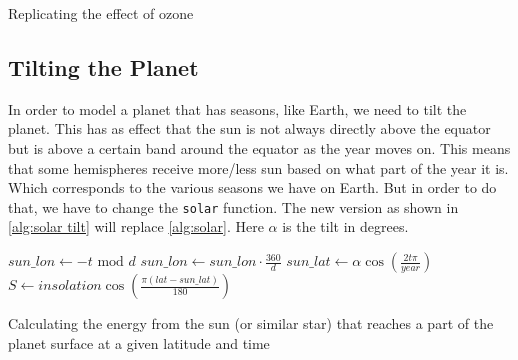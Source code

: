\begin{algorithm}
    \caption{Replicating the effect of ozone}
    \label{alg:ozone}
\end{algorithm}

\subsection{Tilting the Planet}
In order to model a planet that has seasons, like Earth, we need to tilt the planet. This has as effect that the sun is not always directly above the equator but is above a certain band around
the equator as the year moves on. This means that some hemispheres receive more/less sun based on what part of the year it is. Which corresponds to the various seasons we have on Earth. But in
order to do that, we have to change the \texttt{solar} function. The new version as shown in \autoref{alg:solar tilt} will replace \autoref{alg:solar}. Here $\alpha$ is the tilt in degrees.

\begin{algorithm}
    $sun\_lon \leftarrow -t \text{ mod } d$ \;
    $sun\_lon \leftarrow sun\_lon \cdot \frac{360}{d}$ \;
    $sun\_lat \leftarrow \alpha\cos(\frac{2t\pi}{year})$ \;
    $S \leftarrow insolation\cos(\frac{\pi(lat - sun\_lat)}{180})$ \;

     
    \caption{Calculating the energy from the sun (or similar star) that reaches a part of the planet surface at a given latitude and time}
    \label{alg:solar tilt}
\end{algorithm}

